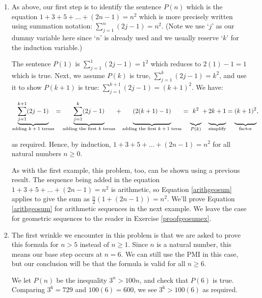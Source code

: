 \documentclass{ximera}
\begin{document}
\begin{example}
\begin{enumerate}
\item  As above, our first step is to identify the sentence $P(n)$ which is the equation $1 + 3 + 5 + \ldots + (2n-1) = n^2$ which is more precisely written using summation notation: $\displaystyle{ \sum_{j=1}^{n} (2j-1) = n^2}$. (Note we use `$j$' as our dummy variable here since `$n$' is already used and we usually reserve `$k$' for the induction variable.)

The sentence $P(1)$ is $\displaystyle{ \sum_{j=1}^{1} (2j-1) = 1^2}$ which reduces to $2(1)-1 = 1$ which is true.  Next, we assume $P(k)$ is true, $\displaystyle{ \sum_{j=1}^{k} (2j-1) = k^2}$,   and use it to show $P(k+1)$ is true: $\displaystyle{ \sum_{j=1}^{k+1} (2j-1) = (k+1)^2}$.  We have: 

\[ \underbrace{\displaystyle{\sum_{j=1}^{k+1} (2j-1)}}_{\text{adding $k+1$ terms}}  = \underbrace{\displaystyle{\sum_{j=1}^{k} (2j-1)}}_{\text{adding the first $k$ terms}} + \underbrace{(2(k+1)-1) \vphantom{\displaystyle{\sum_{j=1}^{k+1}}}}_{\text{adding the first $k+1$ term}} = \underbrace{k^2 \vphantom{\displaystyle{\sum_{j=1}^{k+1}}}}_{\text{$P(k)$}}+ \underbrace{2k+1 \vphantom{\displaystyle{\sum_{j=1}^{k+1}}}}_{\text{simplify}} =\underbrace{(k+1)^2 \vphantom{\displaystyle{\sum_{j=1}^{k+1}}}}_{\text{factor}} , \]

as required.  Hence, by induction, $1 + 3 + 5 + \ldots + (2n-1) = n^2$ for all natural numbers $n \geq 0$.  

As with the first example, this problem, too, can be shown using a previous result.  The sequence being added in the equation $1 + 3 + 5 + \ldots + (2n-1)=n^2$ is arithmetic, so Equation \ref{arithgeosum} applies to give the sum as $\frac{n}{2} (1 + (2n-1)) = n^2$.  We'll prove Equation \ref{arithgeosum} for arithmetic sequences in the next example. We leave the case for geometric sequences to the reader in Exercise \ref{proofgeosumex}.

\item The first wrinkle we encounter in this problem is that we are asked to prove this formula for $n > 5$ instead of $n \geq 1$.  Since $n$ is a natural number, this means our base step occurs at $n=6$.  We can still use the PMI in this case, but our conclusion will be that the formula is valid for all $n \geq 6$.  

\smallskip

We let $P(n)$ be the inequality  $3^{n} > 100n$, and check that $P(6)$ is true. Comparing $3^6 =  729$ and $100(6) = 600$, we see $3^6 > 100(6)$ as required.  


\end{enumerate}
\end{example}
\end{document}
